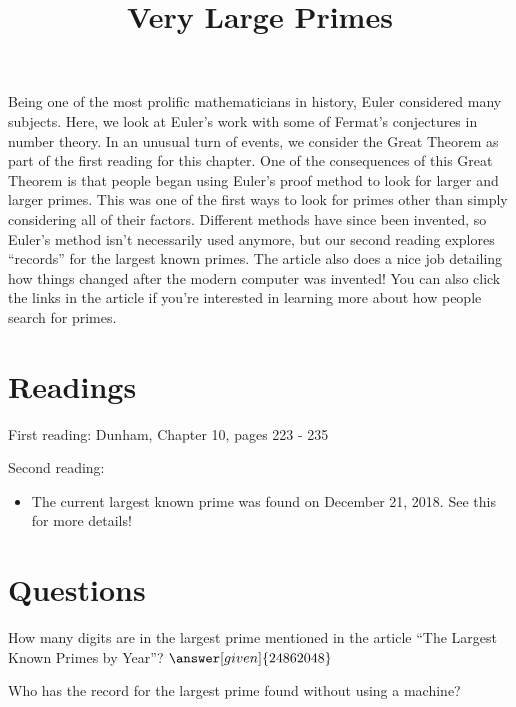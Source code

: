 \documentclass[nooutcomes]{ximera}
\title{Very Large Primes}
\begin{document}
\begin{abstract}
    
\end{abstract}
\maketitle

Being one of the most prolific mathematicians in history, Euler considered many subjects.  Here, we look at Euler's work with some of Fermat's conjectures in number theory.  In an unusual turn of events, we consider the Great Theorem as part of the first reading for this chapter.  One of the consequences of this Great Theorem is that people began using Euler's proof method to look for larger and larger primes.  This was one of the first ways to look for primes other than simply considering all of their factors.  Different methods have since been invented, so Euler's method isn't necessarily used anymore, but our second reading explores ``records'' for the largest known primes.  The article also does a nice job detailing how things changed after the modern computer was invented!  You can also click the links in the article if you're interested in learning more about how people search for primes.


\section{Readings}
First reading: Dunham, Chapter 10, pages 223 - 235

Second reading: 

\begin{itemize}
	\item The current largest known prime was found on December 21, 2018.  See this  for more details!
\end{itemize}



\section{Questions}

\begin{question}
How many digits are in the largest prime mentioned in the article ``The Largest Known Primes by Year''? $\answer[given]{24862048}$
\end{question}

\begin{question}
Who has the record for the largest prime found without using a machine?
\begin{multipleChoice}
\end{multipleChoice}
\end{question}


%
\end{document}
